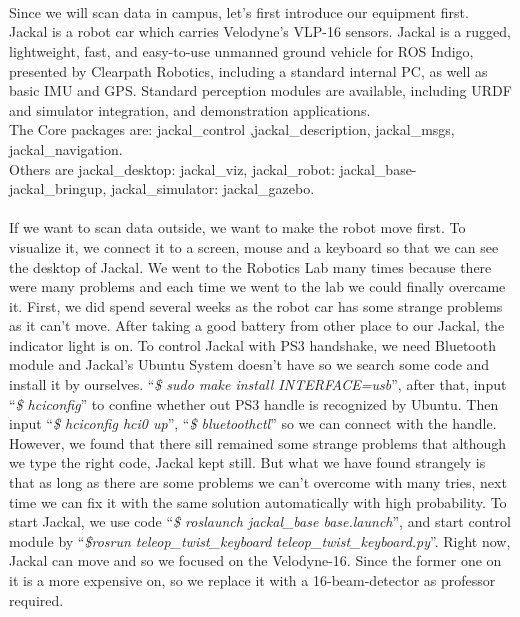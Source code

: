 \documentclass{article}
\begin{document}
\begin{normalsize}
         ~\\
         ~\\
         \\
         Since we will scan data in campus, let’s first introduce our equipment first.\\
         Jackal is a robot car which carries Velodyne’s VLP-16 sensors. Jackal is a rugged, lightweight, fast, and easy-to-use unmanned ground vehicle for ROS Indigo, presented by Clearpath Robotics, including a standard internal PC, as well as basic IMU and GPS. Standard perception modules are available, including URDF and simulator integration, and demonstration applications. \\
         The Core packages are: jackal\_control ,jackal\_description, jackal\_msgs, jackal\_navigation.\\
         Others are jackal\_desktop: jackal\_viz, jackal\_robot: jackal\_base-jackal\_bringup, jackal\_simulator: jackal\_gazebo.\\
         ~\\
         If we want to scan data outside, we want to make the robot move first. To visualize it, we connect it to a screen, mouse and a keyboard so that we can see the desktop of Jackal. We went to the Robotics Lab many times because there were many problems and each time we went to the lab we could finally overcame it. First, we did spend several weeks as the robot car has some strange problems as it can’t move. After taking a good battery from other place to our Jackal, the indicator light is on. To control Jackal with PS3 handshake, we need Bluetooth module and Jackal’s Ubuntu System doesn’t have so we search some code and install it by ourselves. “\emph{\$ sudo make install INTERFACE=usb}”, after that, input “\emph{\$ hciconfig}” to confine whether out PS3 handle is recognized by Ubuntu. Then input “\emph{\$ hciconfig hci0 up}”, “\emph{\$ bluetoothctl}” so we can connect with the handle. However, we found that there sill remained some strange problems that although we type the right code, Jackal kept still. But what we have found strangely is that as long as there are some problems we can’t overcome with many tries, next time we can fix it with the same solution automatically with high probability. To start Jackal, we use code “\emph{\$ roslaunch jackal\_base  base.launch}”, and start control module by “\emph{\$rosrun teleop\_twist\_keyboard teleop\_twist\_keyboard.py}”. Right now, Jackal can move and so we focused on the Velodyne-16. Since the former one on it is a more expensive on, so we replace it with a 16-beam-detector as professor required. \\

\end{normalsize}
\end{document}
